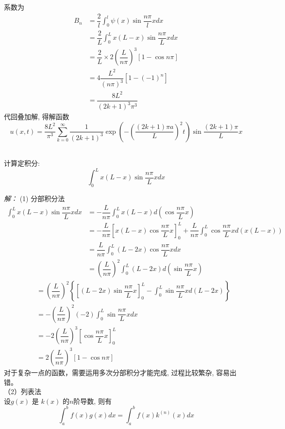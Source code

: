 	系数为
	$$\displaystyle \begin{aligned}
		B_n&= \dfrac{2}{l}\int_{0 }^{l}  \psi (x) \sin \dfrac{ n\pi }{l} x dx  \\
		&= \dfrac{2}{L}\int_{0 }^{L}  x(L-x) \sin \dfrac{ n\pi }{L} x dx  \\
		&=\dfrac{2}{L} \times 2 (\dfrac{L}{n\pi})^3  [1-\cos n \pi ] \\
		&= 4 \dfrac{L^2}{(n\pi)^3}[1-(-1)^n ]  \\
		&= \dfrac{8L^2}{(2k+1)^3\pi^3}
	\end{aligned}$$  
	代回叠加解, 得解函数
	\begin{equation*}
		u(x,t)= \dfrac{8L^2}{\pi^3} \sum\limits_{k=0}^{\infty }  \dfrac{1}{(2k+1)^3}  \exp(-(\dfrac{(2k+1)\pi a}{L})^2 t) \sin \dfrac{(2k+1)\pi}{L} x
	\end{equation*}
~~\\ 
\begin{hint}
计算定积分: $$ \displaystyle \int_{0 }^{L}  x(L-x) \sin \dfrac{ n\pi }{L} x dx$$ 
\end{hint}
\emph{解：}
(1) 分部积分法
$$
\begin{aligned}
	\int_{0 }^{L} x(L-x) \sin \dfrac{ n\pi }{L} x dx &= -\dfrac{L}{ n\pi }\int_{0 }^{L} x(L-x) d(\cos \dfrac{ n\pi }{L} x ) \\
	&= -\dfrac{L}{ n\pi } [x(L-x)\cos \dfrac{ n\pi }{L} x ]_{0 }^{L} + \dfrac{L}{ n\pi } \int_{0 }^{L} \cos \dfrac{ n\pi }{L}xd( x(L-x)  ) \\
	&= \dfrac{L}{ n\pi } \int_{0 }^{L} (L-2x)\cos \dfrac{ n\pi }{L}xdx \\
	&=(\dfrac{L}{ n\pi })^2 \int_{0 }^{L} (L-2x) d(\sin \dfrac{ n\pi }{L}x) 
\end{aligned}
$$
$$
\begin{aligned}
	~~~~~~ 
	&= (\dfrac{L}{ n\pi })^2 \left\{[(L-2x)\sin \dfrac{ n\pi }{L} x ]_{0 }^{L} - \int_{0 }^{L} \sin \dfrac{ n\pi }{L}xd( L-2x )\right\} \\
	&= - (\dfrac{L}{ n\pi })^2 (-2) \int_{0 }^{L} \sin \dfrac{ n\pi }{L}xdx \\
	&= -2(\dfrac{L}{ n\pi })^3 [\cos \dfrac{ n\pi }{L} x ]_{0 }^{L}\\ 
	&= 2 (\dfrac{L}{ n\pi })^3  [1-\cos n \pi ] 
\end{aligned}
$$ 
对于复杂一点的函数，需要运用多次分部积分才能完成, 过程比较繁杂, 容易出错。\\
（2）列表法 \\
设$ g(x)$ 是 $ k(x)$ 的$ n$阶导数, 则有 
$$
\int_a ^b f(x)g(x)dx = \int_a ^b f(x)k^{(n)}(x)dx   
$$ 
